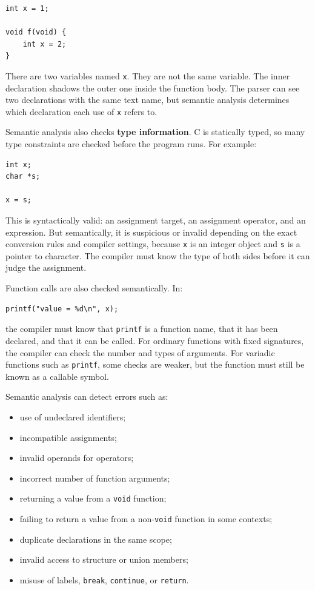 \begin{verbatim}
int x = 1;

void f(void) {
    int x = 2;
}
\end{verbatim}

There are two variables named \texttt{x}. They are not the same variable. The inner declaration shadows the outer one inside the function body. The parser can see two declarations with the same text name, but semantic analysis determines which declaration each use of \texttt{x} refers to.

Semantic analysis also checks \textbf{type information}. C is statically typed, so many type constraints are checked before the program runs. For example:

\begin{verbatim}
int x;
char *s;

x = s;
\end{verbatim}

This is syntactically valid: an assignment target, an assignment operator, and an expression. But semantically, it is suspicious or invalid depending on the exact conversion rules and compiler settings, because \texttt{x} is an integer object and \texttt{s} is a pointer to character. The compiler must know the type of both sides before it can judge the assignment.

Function calls are also checked semantically. In:

\begin{verbatim}
printf("value = %d\n", x);
\end{verbatim}

the compiler must know that \texttt{printf} is a function name, that it has been declared, and that it can be called. For ordinary functions with fixed signatures, the compiler can check the number and types of arguments. For variadic functions such as \texttt{printf}, some checks are weaker, but the function must still be known as a callable symbol.

Semantic analysis can detect errors such as:

\begin{itemize}
    \item use of undeclared identifiers;
    \item incompatible assignments;
    \item invalid operands for operators;
    \item incorrect number of function arguments;
    \item returning a value from a \texttt{void} function;
    \item failing to return a value from a non-\texttt{void} function in some contexts;
    \item duplicate declarations in the same scope;
    \item invalid access to structure or union members;
    \item misuse of labels, \texttt{break}, \texttt{continue}, or \texttt{return}.
\end{itemize}

